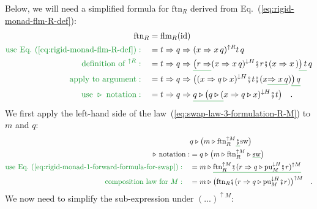 Below, we will need a simplified formula for $\text{ftn}_{R}$ derived
from Eq.~(\ref{eq:rigid-monad-flm-R-def}):
\begin{align}
\text{ftn}_{R} & =\text{flm}_{R}(\text{id})\nonumber \\
{\color{greenunder}\text{use Eq.~(\ref{eq:rigid-monad-flm-R-def})}:}\quad & =t\Rightarrow q\Rightarrow(x\Rightarrow x\,q)^{\uparrow R}t\,q\nonumber \\
{\color{greenunder}\text{definition of }^{\uparrow R}:}\quad & =t\Rightarrow q\Rightarrow\gunderline{\big(r\Rightarrow}(x\Rightarrow x\,q)^{\downarrow H}\bef r\bef(x\Rightarrow x\,)\gunderline{\big)\,t}\,q\nonumber \\
{\color{greenunder}\text{apply to argument}:}\quad & =t\Rightarrow q\Rightarrow\big((x\Rightarrow q\triangleright x)^{\downarrow H}\bef t\bef(x\gunderline{\Rightarrow x\,q})\gunderline{\big)\,q}\nonumber \\
{\color{greenunder}\text{use }\triangleright\text{ notation}:}\quad & =t\Rightarrow q\Rightarrow\gunderline{q\triangleright\big(q\triangleright(}x\Rightarrow q\triangleright x)^{\downarrow H}\bef t\big)\quad.\label{eq:ftn-R-simplified}
\end{align}
We first apply the left-hand side of the law~(\ref{eq:swap-law-3-formulation-R-M})
to $m$ and $q$:
\begin{align*}
 & q\triangleright\big(m\triangleright\text{ftn}_{R}^{\uparrow M}\gunderline{\bef}\text{sw}\big)\\
\triangleright\text{ notation}: & =q\triangleright\big(m\triangleright\text{ftn}_{R}^{\uparrow M}\triangleright\gunderline{\text{sw}}\big)\\
{\color{greenunder}\text{use Eq.~(\ref{eq:rigid-monad-1-forward-formula-for-swap})}:}\quad & =m\triangleright\gunderline{\text{ftn}_{R}^{\uparrow M}\bef(r\Rightarrow q\triangleright\text{pu}_{M}^{\downarrow H}\bef r)^{\uparrow M}}\\
{\color{greenunder}\text{composition law for }M:}\quad & =m\triangleright\big(\text{ftn}_{R}\bef(r\Rightarrow q\triangleright\text{pu}_{M}^{\downarrow H}\bef r)\big)^{\uparrow M}\quad.
\end{align*}
We now need to simplify the sub-expression under $(...)^{\uparrow M}$:

